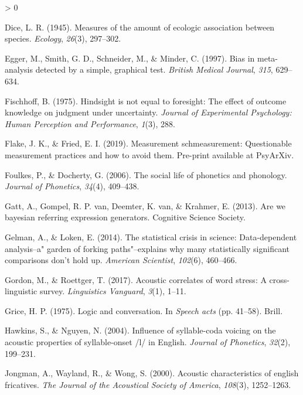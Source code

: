 \documentclass[
  english,
  man,floatsintext]{apa6}
\newlength{\cslhangindent}
\newenvironment{CSLReferences}[2] %
 {%
  \setlength{\parindent}{0pt}
  \ifodd #1 \everypar{\setlength{\hangindent}{\cslhangindent}}\ignorespaces\fi
  \ifnum #2 > 0
  \setlength{\parskip}{#2\baselineskip}
  \fi
 }%
 {}
\begin{document}
\begin{CSLReferences}{1}{0}
\leavevmode\hypertarget{ref-dice1945}{}%
Dice, L. R. (1945). Measures of the amount of ecologic association between species. \emph{Ecology}, \emph{26}(3), 297--302.

\leavevmode\hypertarget{ref-egger1997}{}%
Egger, M., Smith, G. D., Schneider, M., \& Minder, C. (1997). Bias in meta-analysis detected by a simple, graphical test. \emph{British Medical Journal}, \emph{315}, 629--634.

\leavevmode\hypertarget{ref-fischhoff1975hindsight}{}%
Fischhoff, B. (1975). Hindsight is not equal to foresight: The effect of outcome knowledge on judgment under uncertainty. \emph{Journal of Experimental Psychology: Human Perception and Performance}, \emph{1}(3), 288.

\leavevmode\hypertarget{ref-flake2019}{}%
Flake, J. K., \& Fried, E. I. (2019). Measurement schmeasurement: Questionable measurement practices and how to avoid them. Pre-print available at PsyArXiv.

\leavevmode\hypertarget{ref-foulkes2006}{}%
Foulkes, P., \& Docherty, G. (2006). The social life of phonetics and phonology. \emph{Journal of Phonetics}, \emph{34}(4), 409--438.

\leavevmode\hypertarget{ref-gatt2013we}{}%
Gatt, A., Gompel, R. P. van, Deemter, K. van, \& Krahmer, E. (2013). Are we bayesian referring expression generators. Cognitive Science Society.

\leavevmode\hypertarget{ref-gelman2014statistical}{}%
Gelman, A., \& Loken, E. (2014). The statistical crisis in science: Data-dependent analysis--a" garden of forking paths"--explains why many statistically significant comparisons don't hold up. \emph{American Scientist}, \emph{102}(6), 460--466.

\leavevmode\hypertarget{ref-gordon2017acoustic}{}%
Gordon, M., \& Roettger, T. (2017). Acoustic correlates of word stress: A cross-linguistic survey. \emph{Linguistics Vanguard}, \emph{3}(1), 1--11.

\leavevmode\hypertarget{ref-grice1975logic}{}%
Grice, H. P. (1975). Logic and conversation. In \emph{Speech acts} (pp. 41--58). Brill.

\leavevmode\hypertarget{ref-hawkins2004influence}{}%
Hawkins, S., \& Nguyen, N. (2004). Influence of syllable-coda voicing on the acoustic properties of syllable-onset /l/ in {E}nglish. \emph{Journal of Phonetics}, \emph{32}(2), 199--231.

\leavevmode\hypertarget{ref-jongman2000acoustic}{}%
Jongman, A., Wayland, R., \& Wong, S. (2000). Acoustic characteristics of english fricatives. \emph{The Journal of the Acoustical Society of America}, \emph{108}(3), 1252--1263.


\end{CSLReferences}
\end{document}
